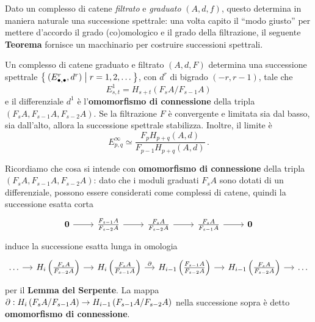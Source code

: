 


Dato un complesso di catene \emph{filtrato} e \emph{graduato} $(A,d,f)$,
questo determina in maniera naturale una successione spettrale:
una volta capito il ``modo giusto'' per mettere d'accordo il grado
(co)omologico e il grado della filtrazione, il seguente \textbf{Teorema}
fornisce un macchinario per costruire successioni spettrali.

\begin{thm}\label{SS-machine}
	Un complesso di catene graduato e filtrato $(A,d,F)$ determina una successione spettrale
	$\Set{(E_{\bullet,\bullet}^{r},d^{r}) | r = 1, 2, \dots}$,
	con $d^{r}$ di bigrado $(-r, r-1)$, tale che
	\begin{equation*}
		E_{s,t}^{1} = H_{s+t}(F_{s}A/F_{s-1}A)
	\end{equation*}
	e il differenziale $d^{1}$ è
	l'\textbf{omomorfismo di connessione} della tripla $(F_{s}A,F_{s-1}A,F_{s-2}A)$.
	Se la filtrazione $F$ è convergente e limitata sia dal basso, sia dall'alto,
	allora la successione spettrale stabilizza. Inoltre, il limite è
	$$E^{\infty}_{p,q} \simeq \frac{F_{p}H_{p+q}(A,d)}{F_{p-1}H_{p+q}(A,d)}\,.$$
\end{thm}

\begin{oss}
	Ricordiamo che cosa si intende con \textbf{omomorfismo di connessione}
	della tripla $(F_{s}A,F_{s-1}A,F_{s-2}A)$: 
	dato che i moduli graduati $F_{s}A$ sono dotati di un differenziale,
	possono essere considerati come complessi di catene,
	quindi la successione esatta corta
	\begin{equation*}
		\begin{tikzcd}
			\cat{0} \ar[r]
			& \frac{F_{s-1}A}{F_{s-2}A} \ar[r]
			& \frac{F_{s}A}{F_{s-2}A} \ar[r]
			& \frac{F_{s}A}{F_{s-1}A} \ar[r]
			& \cat{0}
		\end{tikzcd}
	\end{equation*}
	induce la successione esatta lunga in omologia
	\begin{equation*}
		\begin{tikzcd}[column sep=small]
			\dots \ar[r]
			& H_{i}\left( \frac{F_{s}A}{F_{s-2}A} \right) \ar[r]
			& H_{i}\left( \frac{F_{s}A}{F_{s-1}A} \right) \ar[r, "\de"]
			& H_{i-1}\left( \frac{F_{s-1}A}{F_{s-2}A} \right) \ar[r]
			& H_{i-1}\left( \frac{F_{s}A}{F_{s-2}A} \right) \ar[r]
			& \dots
		\end{tikzcd}
	\end{equation*}
	per il \textbf{Lemma del Serpente}. 
	La mappa $\partial :  H_{i}\left( F_{s}A/F_{s-1}A \right) \to 
	H_{i-1}\left( F_{s-1}A/F_{s-2}A \right)$ nella successione sopra
	è detto \textbf{omomorfismo di connessione}.
\end{oss}	

